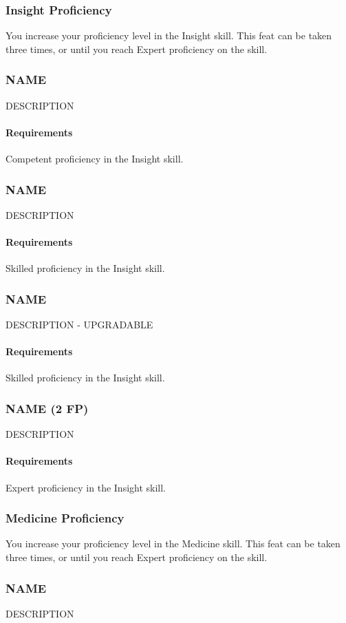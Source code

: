 \subsubsection{Insight Proficiency} \label{feat::insightprof}
    You increase your proficiency level in the Insight skill.
    This feat can be taken three times, or until you reach Expert proficiency on the skill.
\subsubsection{NAME} \label{feat::name}
    DESCRIPTION
    \paragraph{Requirements} Competent proficiency in the Insight skill.
\subsubsection{NAME} \label{feat::name}
    DESCRIPTION
    \paragraph{Requirements} Skilled proficiency in the Insight skill.
\subsubsection{NAME} \label{feat::name}
    DESCRIPTION - UPGRADABLE
    \paragraph{Requirements} Skilled proficiency in the Insight skill.
\subsubsection{NAME (2 FP)} \label{feat::name}
    DESCRIPTION
    \paragraph{Requirements} Expert proficiency in the Insight skill.
\subsubsection{Medicine Proficiency} \label{feat::medicineprof}
    You increase your proficiency level in the Medicine skill.
    This feat can be taken three times, or until you reach Expert proficiency on the skill.
\subsubsection{NAME} \label{feat::name}
    DESCRIPTION

